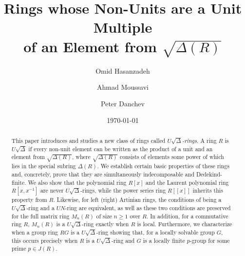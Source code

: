 \documentclass[11pt]{amsart}
\date\today
\theoremstyle{definition}
\begin{document}
\author[O. Hasanzadeh]{Omid Hasanzadeh}
\address{Department of Mathematics, Tarbiat Modares University, 14115-111 Tehran Jalal AleAhmad Nasr, Iran}

\author[A. Moussavi]{Ahmad Moussavi}
\address{Department of Mathematics, Tarbiat Modares University, 14115-111 Tehran Jalal AleAhmad Nasr, Iran}

\author[P. Danchev]{Peter Danchev}
\address{Institute of Mathematics and Informatics, Bulgarian Academy of Sciences, 1113 Sofia, Bulgaria}

\title[$U\sqrt{\Delta}$-rings]{Rings whose Non-Units are a Unit Multiple \\ of an Element from $\sqrt{\Delta(R)}$}

\begin{abstract}
This paper introduces and studies a new class of rings called {\it $U\sqrt{\Delta}$-rings}. A ring $R$ is $U\sqrt{\Delta}$ if every non-unit element can be written as the product of a unit and an element from $\sqrt{\Delta(R)}$, where $\sqrt{\Delta(R)}$ consists of elements some power of which lies in the special subring $\Delta(R)$. We establish certain basic properties of these rings and, concretely, prove that they are simultaneously indecomposable and Dedekind-finite. We also show that the polynomial ring $R[x]$ and the Laurent polynomial ring $R[x, x^{-1}]$ are never $U\sqrt{\Delta}$-rings, while the power series ring $R[[x]]$ inherits this property from $R$. Likewise, for left (right) Artinian rings, the conditions of being a $U\sqrt{\Delta}$-ring and a $UN$-ring are equivalent, as well as these two conditions are preserved for the full matrix ring $M_n(R)$ of size $n\geq 1$ over $R$. In addition, for a commutative ring $R$, $M_n(R)$ is a $U\sqrt{\Delta}$-ring exactly when $R$ is local. Furthermore, we characterize when a group ring $RG$ is a $U\sqrt{\Delta}$-ring showing that, for a locally solvable group $G$, this occurs precisely when $R$ is a $U\sqrt{\Delta}$-ring and $G$ is a locally finite $p$-group for some prime $p \in J(R)$.
\end{abstract}

\maketitle
\end{document}
